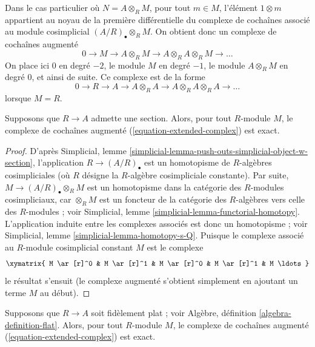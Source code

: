 \medskip\noindent
Dans le cas particulier où
$N = A \otimes_R M$, pour tout $m \in M$,
l'élément $1 \otimes m$ appartient au noyau de la première différentielle
du complexe de cochaînes associé au module cosimplicial
$(A/R)_\bullet \otimes_R M$. On obtient donc un complexe de cochaînes augmenté
\begin{equation}
\label{equation-extended-complex}
0 \to M \to A \otimes_R M \to A \otimes_R A \otimes_R M \to \ldots
\end{equation}
On place ici $0$ en degré $-2$,
le module $M$ en degré $-1$, le module $A \otimes_R M$
en degré $0$, et ainsi de suite. Ce complexe est de la forme
$$
0 \to R \to A \to A \otimes_R A \to A \otimes_R A \otimes_R A \to \ldots
$$
lorsque $M = R$.

\begin{lemma}
\label{lemma-with-section-exact}
Supposons que $R \to A$ admette une section.
Alors, pour tout $R$-module $M$, le complexe de cochaînes augmenté
(\ref{equation-extended-complex}) est exact.
\end{lemma}

\begin{proof}
D'après
Simplicial, lemme \ref{simplicial-lemma-push-outs-simplicial-object-w-section},
l'application $R \to (A/R)_\bullet$ est un homotopisme
de $R$-algèbres cosimpliciales
(où $R$ désigne la $R$-algèbre cosimpliciale constante).
Par suite, $M \to (A/R)_\bullet \otimes_R M$ est
un homotopisme dans la catégorie des
$R$-modules cosimpliciaux, car $\otimes_R M$ est
un foncteur de la catégorie des $R$-algèbres vers celle
des $R$-modules ; voir
Simplicial, lemme \ref{simplicial-lemma-functorial-homotopy}.
L'application induite entre les complexes associés est donc
un homotopisme ; voir
Simplicial, lemme \ref{simplicial-lemma-homotopy-s-Q}.
Puisque le complexe associé au $R$-module cosimplicial constant
$M$ est le complexe
$$
\xymatrix{
M \ar[r]^0 & M \ar[r]^1 & M \ar[r]^0 & M \ar[r]^1 & M \ldots
}
$$
le résultat s'ensuit (le complexe augmenté s'obtient simplement en ajoutant
un terme $M$ au début).
\end{proof}

\begin{lemma}
\label{lemma-ff-exact}
Supposons que $R \to A$ soit fidèlement plat ; voir
Algèbre, définition \ref{algebra-definition-flat}.
Alors, pour tout $R$-module $M$, le complexe de cochaînes augmenté
(\ref{equation-extended-complex}) est exact.
\end{lemma}

